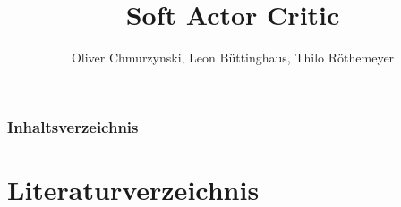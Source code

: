 \documentclass[11pt]{beamer}
\author{Oliver Chmurzynski, Leon Büttinghaus, Thilo Röthemeyer}
\title{Soft Actor Critic}
\begin{document}
\begin{frame}
\titlepage
\end{frame}


\begin{frame}
    \frametitle{Inhaltsverzeichnis}
    \tableofcontents
\end{frame}





\section{Literaturverzeichnis}
\begin{frame}
{\tiny
\nocite{actorcritic}
\nocite{SAC19}
\nocite{SAC18}
\nocite{autoencoding}
\nocite{grokking}
\nocite{FuncApp}

}
\end{frame}
\end{document}
